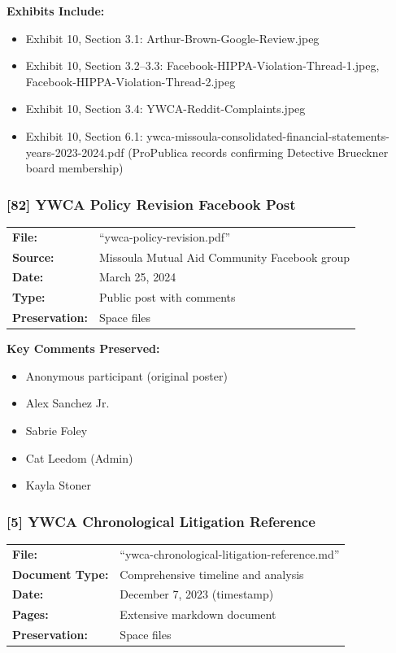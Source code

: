 \documentclass[11pt,letterpaper]{article}
\newcommand{\citeref}[1]{\textbf{\color{NavyBlue}[#1]}}
\begin{document}
\textbf{Exhibits Include:}
\begin{itemize}[leftmargin=*]
\item Exhibit 10, Section 3.1: Arthur-Brown-Google-Review.jpeg
\item Exhibit 10, Section 3.2--3.3: Facebook-HIPPA-Violation-Thread-1.jpeg, Facebook-HIPPA-Violation-Thread-2.jpeg
\item Exhibit 10, Section 3.4: YWCA-Reddit-Complaints.jpeg
\item Exhibit 10, Section 6.1: ywca-missoula-consolidated-financial-statements-years-2023-2024.pdf (ProPublica records confirming Detective Brueckner board membership)
\end{itemize}

\subsubsection{\citeref{82} YWCA Policy Revision Facebook Post}

\begin{tabular}{@{}p{1.4in}p{4.6in}@{}}
\textbf{File:} & ``ywca-policy-revision.pdf''\\
\textbf{Source:} & Missoula Mutual Aid Community Facebook group\\
\textbf{Date:} & March 25, 2024\\
\textbf{Type:} & Public post with comments\\
\textbf{Preservation:} & Space files\\
\end{tabular}

\vspace{0.1in}

\textbf{Key Comments Preserved:}
\begin{itemize}[leftmargin=*]
\item Anonymous participant (original poster)
\item Alex Sanchez Jr.
\item Sabrie Foley
\item Cat Leedom (Admin)
\item Kayla Stoner
\end{itemize}

\subsubsection{\citeref{5} YWCA Chronological Litigation Reference}

\begin{tabular}{@{}p{1.4in}p{4.6in}@{}}
\textbf{File:} & ``ywca-chronological-litigation-reference.md''\\
\textbf{Document Type:} & Comprehensive timeline and analysis\\
\textbf{Date:} & December 7, 2023 (timestamp)\\
\textbf{Pages:} & Extensive markdown document\\
\textbf{Preservation:} & Space files\\
\end{tabular}
\end{document}
